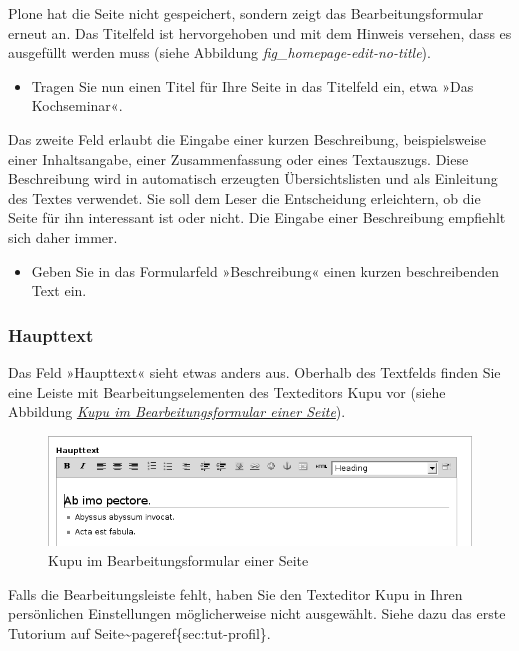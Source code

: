 \documentclass[a4paper,12pt,ngerman]{manual}
\begin{document}
Plone hat die Seite nicht gespeichert, sondern zeigt das Bearbeitungsformular
erneut an. Das Titelfeld ist hervorgehoben und mit dem Hinweis versehen, dass
es ausgefüllt werden muss (siehe
Abbildung \emph{fig\_homepage-edit-no-title}).
\hypertarget{fig-homepage-edit-no-title}{}\begin{itemize}
\item {} 
Tragen Sie nun einen Titel für Ihre Seite in das Titelfeld ein, etwa
»Das Kochseminar«.

\end{itemize}

Das zweite Feld erlaubt die Eingabe einer kurzen Beschreibung, beispielsweise
einer Inhaltsangabe, einer Zusammenfassung oder eines Textauszugs.  Diese
Beschreibung wird in automatisch erzeugten Übersichtslisten und als Einleitung
des Textes verwendet.  Sie soll dem Leser die Entscheidung erleichtern, ob die
Seite für ihn interessant ist oder nicht. Die Eingabe einer Beschreibung
empfiehlt sich daher immer.
\begin{itemize}
\item {} 
Geben Sie in das Formularfeld »Beschreibung« einen kurzen
beschreibenden Text ein.

\end{itemize}


\subsubsection{Haupttext}

Das Feld »Haupttext« sieht etwas anders aus. Oberhalb des Textfelds finden
Sie eine Leiste mit Bearbeitungselementen des Texteditors Kupu vor (siehe
Abbildung \hyperlink{fig-homepage-edit-2}{\emph{Kupu im Bearbeitungsformular einer Seite}}).
\hypertarget{fig-homepage-edit-2}{}\begin{figure}[htbp]
\centering

\includegraphics{homepage-edit-2.png}
\caption{Kupu im Bearbeitungsformular einer Seite}\end{figure}

Falls die Bearbeitungsleiste fehlt, haben Sie den Texteditor Kupu in Ihren
persönlichen Einstellungen möglicherweise nicht ausgewählt. Siehe dazu das
erste Tutorium auf Seite\textasciitilde{}pageref\{sec:tut-profil\}.
\end{document}
